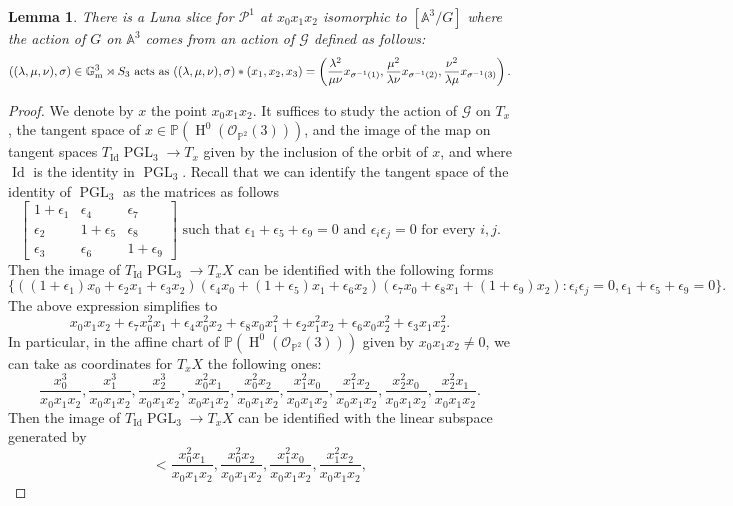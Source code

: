 \documentclass{amsart}
\newcommand{\bA}{\mathbb{A}}
\newcommand{\bG}{\mathbb{G}}
\newcommand{\bP}{\mathbb{P}}
\newcommand{\oH}{\operatorname{H}}
\newcommand{\sP}{\mathscr{P}}
\newcommand{\cG}{\mathcal{G}}
\newcommand{\cO}{\mathcal{O}}
\newcommand{\Gm}{\bG_{{\rm m}}}
\newcommand{\PGL}{\operatorname{PGL}}
\newcommand{\Id}{\operatorname{Id}}
\newtheorem{Lemma}[theorem]{Lemma}
\theoremstyle{definition}
\theoremstyle{definition}
\begin{document}
{\begin{Lemma}\label{lemma_luna_slice_curlyP1}
    There is a Luna slice for $\sP^1$ at $x_0x_1x_2$ isomorphic to $[\bA^3/G]$ where the action of $G$ on $\bA^3$ comes from an action of $\cG$ defined as follows:
    \begin{align*}
    ((\lambda,\mu,\nu),\sigma)\in \Gm^3\rtimes S_3\text{ acts as }((\lambda,\mu,\nu),\sigma)*(x_1,x_2,x_3) = \left(\frac{\lambda^2}{\mu\nu}x_{\sigma^{-1}(1)}, \frac{\mu^2}{\lambda\nu}x_{\sigma^{-1}(2)}, \frac{\nu^2}{\lambda\mu}x_{\sigma^{-1}(3)}\right).
    \end{align*}
\end{Lemma}
\begin{proof} We denote by $x$ the point $x_0x_1x_2$.
It suffices to study the action of $\cG$ on $T_x$, the tangent space of $x\in \bP(\oH^0(\cO_{\bP^2}(3)))$, and the image of the map on tangent spaces $T_{\Id}\PGL_3\to T_x$ given by the inclusion of the orbit of $x$, and 
where $\Id$ is the identity in $\PGL_3$. Recall that we can identify the tangent space of the identity of $\PGL_3$ as the matrices as follows
\[
\begin{bmatrix}1+\epsilon_1&\epsilon_4&\epsilon_7\\\epsilon_2&1+\epsilon_5&\epsilon_8\\\epsilon_3&\epsilon_6&1+\epsilon_9
\end{bmatrix}\text{ such that }\epsilon_1+\epsilon_5+\epsilon_9=0\text{ and }\epsilon_i\epsilon_j=0\text{ for every }i,j.\]
Then the image of $T_{\Id}\PGL_3\to T_xX$ can be identified with the following forms \[\{((1+\epsilon_1)x_0+\epsilon_2x_1+\epsilon_3x_2)(\epsilon_4x_0+(1+\epsilon_5)x_1+\epsilon_6x_2)(\epsilon_7x_0+\epsilon_8x_1+(1+\epsilon_9)x_2):\epsilon_i\epsilon_j=0, \epsilon_1+ \epsilon_5+\epsilon_9=0\}.\]
The above expression simplifies to
\[x_0x_1x_2 + \epsilon_7x_0^2x_1 +\epsilon_4x_0^2x_2+\epsilon_8x_0x_1^2 +\epsilon_2x_1^2x_2 + \epsilon_6x_0x_2^2 + \epsilon_3x_1x_2^2.\]
In particular, in the affine chart of $\bP(\oH^0(\cO_{\bP^2}(3)))$ given by $x_0x_1x_2\neq 0$, we can take as coordinates for $T_xX$ the following ones:
\[\frac{x_0^3}{x_0x_1x_2}, \frac{x_1^3}{x_0x_1x_2}, \frac{x_2^3}{x_0x_1x_2}, \frac{x_0^2x_1}{x_0x_1x_2},
\frac{x_0^2x_2}{x_0x_1x_2},
\frac{x_1^2x_0}{x_0x_1x_2},
\frac{x_1^2x_2}{x_0x_1x_2},
\frac{x_2^2x_0}{x_0x_1x_2},
\frac{x_2^2x_1}{x_0x_1x_2}.
\] Then the image of $T_{\Id}\PGL_3\to T_xX$ can be identified with the linear subspace generated by \[
<\frac{x_0^2x_1}{x_0x_1x_2},
\frac{x_0^2x_2}{x_0x_1x_2},
\frac{x_1^2x_0}{x_0x_1x_2},
\frac{x_1^2x_2}{x_0x_1x_2},
\]
\end{proof}}
\end{document}
